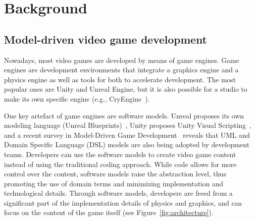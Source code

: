 \section{Background} \label{sec:Background}

\subsection{Model-driven video game development}
Nowadays, most video games are developed by means of game engines. Game engines are development environments that integrate a graphics engine and a physics engine as well as tools for both to accelerate development. The most popular ones are Unity and Unreal Engine, but it is also possible for a studio to make its own specific engine (e.g., CryEngine~\cite{cryengine}). 

One key artefact of game engines are software models. Unreal proposes its own modeling language (Unreal Blueprints)~\cite{unrealblueprint}, Unity proposes Unity Visual Scripting~\cite{unityscripting}, and a recent survey in Model-Driven Game Development~\cite{zhu2019model} reveals that UML and Domain Specific Language (DSL) models are also being adopted by development teams. Developers can use the software models to create video game content instead of using the traditional coding approach. While code allows for more control over the content, software models raise the abstraction level, thus promoting the use of domain terms and minimizing implementation and technological details. Through software models, developers are freed from a significant part of the implementation details of physics and graphics, and can focus on the content of the game itself (see Figure~\ref{fig:architecture}).

